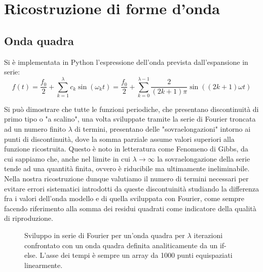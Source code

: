 \documentclass{article}[a4paper, oneside ,11pt]
\begin{document}
\section{Ricostruzione di forme d'onda}
\subsection{Onda quadra}
Si è implementata in Python l'espressione dell'onda prevista dall'espansione in serie:
\begin{equation}\label{eq:sqw}
f(t) = \frac{f_0}{2} + \sum_{k=1}^{\lambda} c_k \sin{(\omega_kt)} = \frac{f_0}{2} + \sum_{k=0}^{\lambda -1} \frac{2}{(2k+1)\pi} \sin{\left((2k+1)\omega t\right)}
\end{equation}

Si può dimostrare che tutte le funzioni periodiche, che presentano discontinuità di primo tipo o "a scalino", una volta sviluppate tramite la serie di Fourier troncata ad un numero finito $\lambda$ di termini, presentano delle "sovraelongazioni" intorno ai punti di discontinuità, dove la somma parziale assume valori superiori alla funzione ricostruita. Questo è noto in letteratura come Fenomeno di Gibbs\cite{gibbs}, da cui sappiamo che, anche nel limite in cui $\lambda \longrightarrow \infty$ la sovraelongazione della serie tende ad una quantità finita, ovvero è riducibile ma ultimamente ineliminabile. Nella nostra ricostruzione dunque valutiamo il numero di termini necessari per evitare errori sistematici introdotti da queste discontuinità studiando la differenza fra i valori dell'onda modello e di quella sviluppata con Fourier, come sempre facendo riferimento alla somma dei residui quadrati come indicatore della qualità di riproduzione.
\begin{figure}[!htb]
	\scalebox{0.55}{}\hfill \scalebox{0.55}{}
	\scalebox{0.55}{}\hfill \scalebox{0.55}{}
 	\caption{Sviluppo in serie di Fourier per un’onda quadra per $\lambda$ iterazioni confrontato con un onda quadra definita analiticamente da un if-else. L'asse dei tempi è sempre un array da 1000 punti equispaziati linearmente.
 \label{plt:sqw}}
\end{figure}
\end{document}
